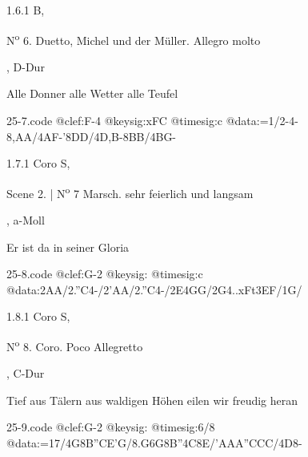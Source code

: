 \documentclass[a4paper, twocolumn, 11pt]{book}
\begin{document}
\newline %
\par 1.6.1  B, \begin{itshape}N\textsuperscript{o} 6. Duetto, Michel und der Müller. Allegro molto\end{itshape}, D-Dur\newline \begin{footnotesize} Alle Donner alle Wetter alle Teufel \end{footnotesize}  
\begin{filecontents*}{25-7.code}
@clef:F-4
@keysig:xFC
@timesig:c
@data:=1/2-4-8,AA/4AF-'8DD/4D,B-8BB/4BG-
\end{filecontents*}

\newline %
\par 1.7.1  Coro S, \begin{itshape}Scene 2. | N\textsuperscript{o} 7 Marsch. sehr feierlich und langsam\end{itshape}, a-Moll\newline \begin{footnotesize} Er ist da in seiner Gloria \end{footnotesize}  
\begin{filecontents*}{25-8.code}
@clef:G-2
@keysig:
@timesig:c
@data:2AA/2.''C4-/2'AA/2.''C4-/2E4GG/2G4..xFt{3EF}/1G/
\end{filecontents*}

\newline %
\par 1.8.1  Coro S, \begin{itshape}N\textsuperscript{o} 8. Coro. Poco Allegretto\end{itshape}, C-Dur\newline \begin{footnotesize} Tief aus Tälern aus waldigen Höhen eilen wir freudig heran \end{footnotesize}  
\begin{filecontents*}{25-9.code}
@clef:G-2
@keysig:
@timesig:6/8
@data:=17/4G8B{''CE}'G/{8.G6G}8B''4C8E/'AAA''CCC/4D8-
\end{filecontents*}
\end{document}
